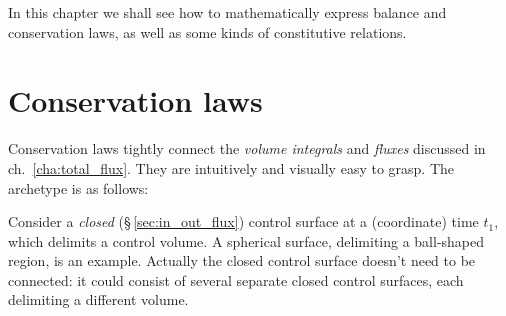 \documentclass[a4paper,12pt,%
onecolumn,oneside,titlepage,%
british%
]{memoir}
\renewcommand*{\|}[1][]{\nonscript\:#1\vert\nonscript\:\mathopen{}}
\newcommand*{\sect}{\S}%
\newcommand*{\chap}{ch.}%
\begin{document}
In this chapter we shall see how to mathematically express balance and conservation laws, as well as some kinds of constitutive relations.



\section{Conservation laws}
\label{sec:conservation_laws}

Conservation laws tightly connect the \emph{volume integrals} and \emph{fluxes} discussed in \chap~\ref{cha:total_flux}. They are intuitively and visually easy to grasp. The archetype is as follows:

Consider a \emph{closed} (\sect\,\ref{sec:in_out_flux}) control surface at a (coordinate) time $t_{1}$, which delimits a control volume. A spherical surface, delimiting a ball-shaped region, is an example. Actually the closed control surface doesn't need to be connected: it could consist of several separate closed control surfaces, each delimiting a different volume.
\end{document}
